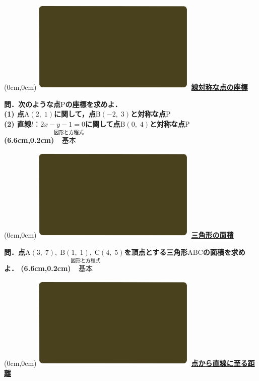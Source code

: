 \documentclass[10pt,
fleqn,
dvipdfmx,
uplatex
]{jsarticle}
\begin{document}
\at(0cm,0cm){\includegraphics[width=8cm,bb=0 0 1920 1080]{./youtube/thumbnails/templates/smart_background/図形と方程式.jpeg}}
{\color{orange}\bf\boldmath\huge\underline{線対称な点の座標}}\vspace{0.3zw}

\large 
\bf\boldmath 問．次のような点$\text{P}$の座標を求めよ．\\
(1)  点$\text{A}\left(2,\;1\right)$に関して，点$\text{B}\left(-2,\;3\right)$と対称な点$\text{P}$\\
(2)  直線$l：2x-y-1=0$に関して点$\text{B}\left(0,\;4\right)$と対称な点$\text{P}$\\

\at(6.6cm,0.2cm){\small\color{bradorange}$\overset{\text{図形と方程式}}{\text{基本}}$}


\newpage



\at(0cm,0cm){\includegraphics[width=8cm,bb=0 0 1920 1080]{./youtube/thumbnails/templates/smart_background/図形と方程式.jpeg}}
{\color{orange}\bf\boldmath\huge\underline{三角形の面積}}\vspace{0.3zw}

\LARGE 
\bf\boldmath 問．点$\text{A}\left(3,\;7\right),\;\text{B}\left(1,\;1\right),\;\text{C}\left(4,\;5\right)$を頂点とする三角形$\text{ABC}$の面積を求めよ．
\at(6.6cm,0.2cm){\small\color{bradorange}$\overset{\text{図形と方程式}}{\text{基本}}$}


\newpage



\at(0cm,0cm){\includegraphics[width=8cm,bb=0 0 1920 1080]{./youtube/thumbnails/templates/smart_background/図形と方程式.jpeg}}
{\color{orange}\bf\boldmath\LARGE\underline{点から直線に至る距離}}\vspace{0.3zw}
\end{document}
